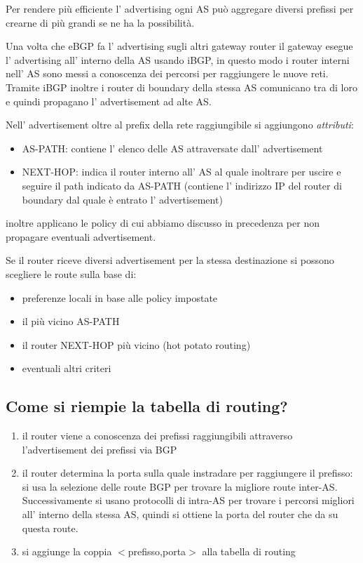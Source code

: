 Per rendere più efficiente l' advertising ogni AS può aggregare diversi prefissi per crearne di più grandi se ne ha la possibilità.

Una volta che eBGP fa l' advertising sugli altri gateway router il gateway esegue l' advertising all' interno della AS usando iBGP, in questo modo i router interni nell' AS sono messi a conoscenza dei percorsi per raggiungere le nuove reti.
Tramite iBGP inoltre i router di boundary della stessa AS comunicano tra di loro e quindi propagano l' advertisement ad alte AS.

Nell' advertisement oltre al prefix della rete raggiungibile si aggiungono \emph{attributi}:
\begin{itemize}
    \item AS-PATH: contiene l' elenco delle AS attraversate dall' advertisement
    \item NEXT-HOP: indica il router interno all' AS al quale inoltrare per uscire e seguire il path indicato da AS-PATH (contiene l' indirizzo IP del router di boundary dal quale è entrato l' advertisement)
\end{itemize}
inoltre applicano le policy di cui abbiamo discusso in precedenza per non propagare eventuali advertisement.

Se il router riceve diversi advertisement per la stessa destinazione si possono scegliere le route sulla base di:
\begin{itemize}
    \item preferenze locali in base alle policy impostate
    \item il più vicino AS-PATH
    \item il router NEXT-HOP più vicino (hot potato routing)
    \item eventuali altri criteri
\end{itemize}

\subsection{Come si riempie la tabella di routing?}
\begin{enumerate}
    \item il router viene a conoscenza dei prefissi raggiungibili attraverso l'advertisement dei prefissi via BGP
    \item il router determina la porta sulla quale instradare per raggiungere il prefisso: si usa la selezione delle route BGP per trovare la migliore route inter-AS.
    Successivamente si usano protocolli di intra-AS per trovare i percorsi migliori all' interno della stessa AS, quindi si ottiene la porta del router che da su questa route.
    \item si aggiunge la coppia $<$prefisso,porta$>$ alla tabella di routing
\end{enumerate}

